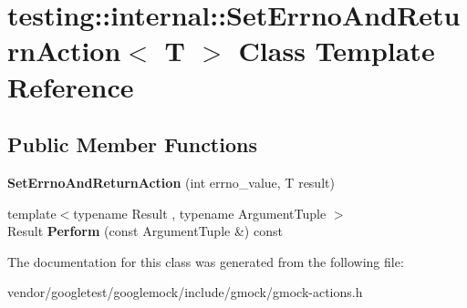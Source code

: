 \hypertarget{classtesting_1_1internal_1_1SetErrnoAndReturnAction}{}\section{testing\+:\+:internal\+:\+:Set\+Errno\+And\+Return\+Action$<$ T $>$ Class Template Reference}
\label{classtesting_1_1internal_1_1SetErrnoAndReturnAction}
\subsection*{Public Member Functions}
\begin{DoxyCompactItemize}
\item 
{\bfseries Set\+Errno\+And\+Return\+Action} (int errno\+\_\+value, T result)\hypertarget{classtesting_1_1internal_1_1SetErrnoAndReturnAction_abfe5a194a9b8f2b303c635ad99b3a257}{}\label{classtesting_1_1internal_1_1SetErrnoAndReturnAction_abfe5a194a9b8f2b303c635ad99b3a257}

\item 
{\footnotesize template$<$typename Result , typename Argument\+Tuple $>$ }\\Result {\bfseries Perform} (const Argument\+Tuple \&) const \hypertarget{classtesting_1_1internal_1_1SetErrnoAndReturnAction_aced34306c80406663b57465f85ef70a9}{}\label{classtesting_1_1internal_1_1SetErrnoAndReturnAction_aced34306c80406663b57465f85ef70a9}

\end{DoxyCompactItemize}


The documentation for this class was generated from the following file\+:\begin{DoxyCompactItemize}
\item 
vendor/googletest/googlemock/include/gmock/gmock-\/actions.\+h\end{DoxyCompactItemize}
